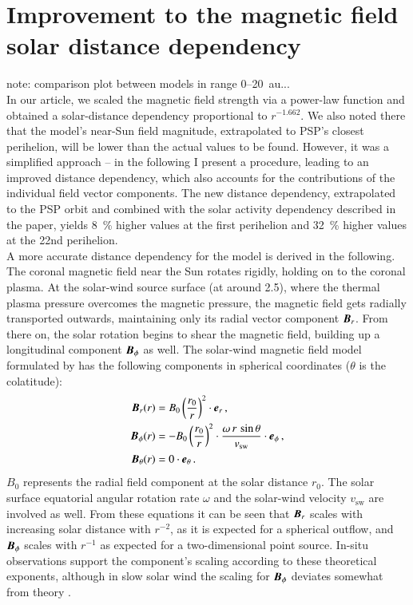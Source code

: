\section{Improvement to the magnetic field solar distance dependency}

note: comparison plot between models in range 0--20~au...\\

In our article, we scaled the magnetic field strength via a power-law function and obtained a solar-distance dependency proportional to $r^{-1.662}$. We also noted there that the model's near-Sun field magnitude, extrapolated to PSP's closest perihelion, will be lower than the actual values to be found. However, it was a simplified approach -- in the following I present a procedure, leading to an improved distance dependency, which also accounts for the contributions of the individual field vector components. The new distance dependency, extrapolated to the PSP orbit and combined with the solar activity dependency described in the paper, yields \SI{8}{\%} higher values at the first perihelion and \SI{32}{\%} higher values at the 22nd perihelion.\\

A more accurate distance dependency for the model is derived in the following.\\

The coronal magnetic field near the Sun rotates rigidly, holding on to the coronal plasma. At the solar-wind source surface (at around \SI{2.5}{\Rs}), where the thermal plasma pressure overcomes the magnetic pressure, the magnetic field gets radially transported outwards, maintaining only its radial vector component $\boldsymbol{B}_r$. From there on, the solar rotation begins to shear the magnetic field, building up a longitudinal component $\boldsymbol{B}_\phi$ as well. The solar-wind magnetic field model formulated by \citet{Parker1958} has the following components in spherical coordinates ($\theta$ is the colatitude):
\begin{align}
	\boldsymbol{B}_r(r) &= B_0 \left(\frac{r_0}{r}\right)^2 \cdot \boldsymbol{e}_r\,,\\
	\boldsymbol{B}_\phi(r) &= -B_0 \left(\frac{r_0}{r}\right)^2 \cdot \frac{\omega\,r\,\sin\theta}{v_\text{sw}} \cdot \boldsymbol{e}_\phi	\,,	\label{eq:b_phi_vector}\\
	\boldsymbol{B}_\theta(r) &= 0 \cdot \boldsymbol{e}_\theta\,.
\end{align}
$B_0$ represents the radial field component at the solar distance $r_0$. The solar surface equatorial angular rotation rate $\omega$ and the solar-wind velocity $v_\text{sw}$ are involved as well. From these equations it can be seen that $\boldsymbol{B}_r$ scales with increasing solar distance with $r^{-2}$, as it is expected for a spherical outflow, and $\boldsymbol{B}_\phi$ scales with $r^{-1}$ as expected for a two-dimensional point source. In-situ observations support the component's scaling according to these theoretical exponents, although in slow solar wind the scaling for $\boldsymbol{B}_\phi$ deviates somewhat from theory \citep{Mariani1978}.\\

